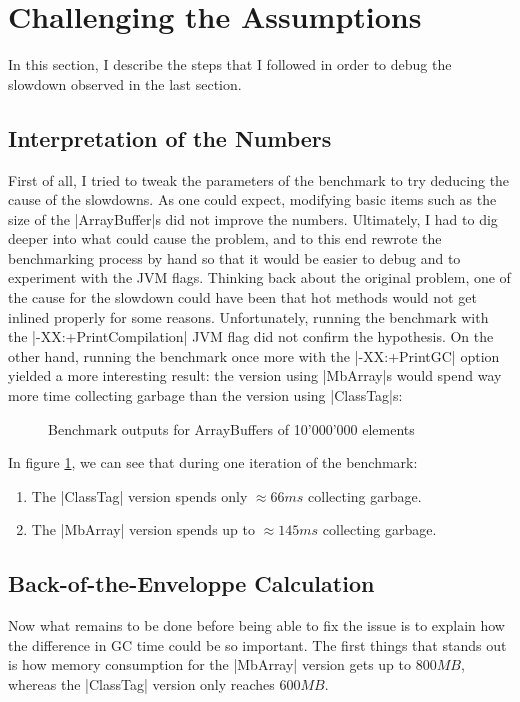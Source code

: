 
\section{Challenging the Assumptions}

In this section, I describe the steps that I followed in order to debug the slowdown observed in the last section.

\subsection{Interpretation of the Numbers}

First of all, I tried to tweak the parameters of the benchmark to try deducing the cause of the slowdowns. As one could expect, modifying basic items such as the size of the |ArrayBuffer|s did not improve the numbers. Ultimately, I had to dig deeper into what could cause the problem, and to this end rewrote the benchmarking process by hand so that it would be easier to debug and to experiment with the JVM flags. Thinking back about the original problem, one of the cause for the slowdown could have been that hot methods would not get inlined properly for some reasons. Unfortunately, running the benchmark with the |-XX:+PrintCompilation| JVM flag did not confirm the hypothesis. On the other hand, running the benchmark once more with the |-XX:+PrintGC| option yielded a more interesting result: the version using |MbArray|s would spend way more time collecting garbage than the version using |ClassTag|s:

\begin{figure}
\centering
{}
\caption{Benchmark outputs for ArrayBuffers of 10'000'000 elements}\label{fig:BenchOuts}
\label{fig:GcComp}
\end{figure}

In figure \ref{fig:GcComp}, we can see that during one iteration of the benchmark:
\begin{enumerate}
  \item The |ClassTag| version spends only $\approx 66ms$ collecting garbage.
  \item The |MbArray| version spends up to $\approx 145ms$ collecting garbage. 
\end{enumerate} 

\subsection{Back-of-the-Enveloppe Calculation}

Now what remains to be done before being able to fix the issue is to explain how the difference in GC time could be so important.
The first things that stands out is how memory consumption for the |MbArray| version gets up to $800MB$, whereas the |ClassTag| version only reaches $600MB$.


